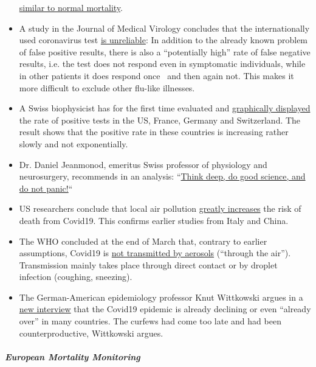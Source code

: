 \begin{itemize}
  \href{https://www.vienna.at/analyse-zeigt-covid-19-opferkurve-entspricht-normaler-mortalitaet/6581246}{similar
  to normal mortality}.
\item
  A study in the Journal of Medical Virology concludes that the
  internationally used coronavirus test
  \href{https://www.ncbi.nlm.nih.gov/pubmed/32219885}{is unreliable}: In
  addition to the already known problem of false positive results, there
  is also a ``potentially high'' rate of false negative results, i.e.
  the test does not respond even in symptomatic individuals, while in
  other patients it does respond once~ and then again not. This makes it
  more difficult to exclude other flu-like illnesses.
\item
  A Swiss biophysicist has for the first time evaluated and
  \href{https://swprs.org/rate-of-positive-covid19-tests/}{graphically
  displayed} the rate of positive tests in the US, France, Germany and
  Switzerland. The result shows that the positive rate in these
  countries is increasing rather slowly and not exponentially.
\item
  Dr. Daniel Jeanmonod, emeritus Swiss professor of physiology and
  neurosurgery, recommends in an analysis:
  ``\href{https://off-guardian.org/2020/04/07/think-deep-do-good-science-and-do-not-panic/}{Think
  deep, do good science, and do not panic!}``
\item
  US researchers conclude that local air pollution
  \href{https://www.medrxiv.org/content/10.1101/2020.04.05.20054502v1}{greatly
  increases} the risk of death from Covid19. This confirms earlier
  studies from Italy and China.
\item
  The WHO concluded at the end of March that, contrary to earlier
  assumptions, Covid19 is
  \href{https://www.who.int/news-room/commentaries/detail/modes-of-transmission-of-virus-causing-covid-19-implications-for-ipc-precaution-recommendations}{not
  transmitted by aerosols} (``through the air''). Transmission mainly
  takes place through direct contact or by droplet infection (coughing,
  sneezing).
\item
  The German-American epidemiology professor Knut Wittkowski argues in a
  \href{https://www.youtube.com/watch?v=ARTf4bpiXuI}{new interview} that
  the Covid19 epidemic is already declining or even ``already over'' in
  many countries. The curfews had come too late and had been
  counterproductive, Wittkowski argues.
\end{itemize}

\hypertarget{european-mortality-monitoring}{%
\subparagraph{\texorpdfstring{\textbf{European Mortality
Monitoring}}{European Mortality Monitoring}}\label{european-mortality-monitoring}}


